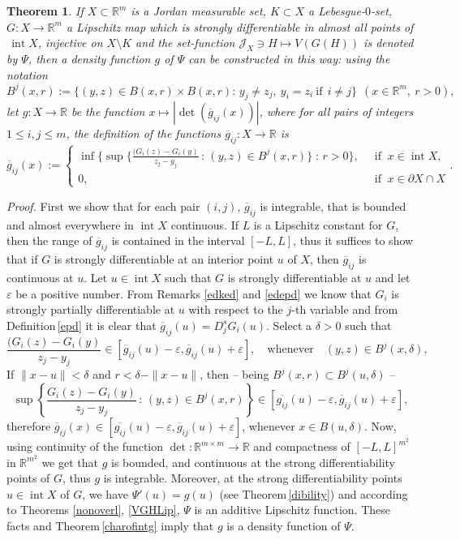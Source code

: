 \documentclass{article}
\newcommand{\proof}[1]{\textit{Proof. }#1}
\newtheorem{theorem}{Theorem}
\newcommand{\ir}{\mathop{\mathrm{int}}\nolimits}
\newcommand{\R}{\ensuremath{\mathbb R}}
\newcommand{\J}{\mathscr{J}}
\newcommand{\ee}{\varepsilon}
\newcommand{\dd}{\delta}
\newcommand{\ol}{\overline}
\begin{document}
\begin{theorem}\label{konkrsfv}
If $X\subset\R^m$ is a Jordan measurable set, $K\subset X$ a
Lebesgue-$0$-set, $G:X\to\R^m$ a Lipschitz map which is strongly
differentiable in almost all points of $\,\ir X$, injective on
$X\setminus K$ and the set-function $\J_X\ni H\mapsto V(G(H))$ is
denoted by $\Psi$, then a density function $g$ of $\Psi$ can be
constructed in this way: using the notation
\[B^j(x,r):=\{(y,z)\in B(x,r)\times B(x,r):\,y_j\neq z_j, \
y_i=z_i\ \mbox{if}\ \ i\neq j\}\ \  (x\in\R^m, \ r>0),\] let
$g\colon X\to\R$ be the function $x\mapsto|\det(\ol{g}_{ij}(x))|$,
where for all pairs of integers $1\le i,j\le m$, the definition of
the functions $\ol{g}_{ij}\colon X\to \R$ is
\[\ol{g}_{ij}(x):=\left\{
   \begin{array}{rl}
 \inf\{\sup\{\frac{(G_i(z)-G_i(y)}{z_j-y_j}\,:\,(y,z)\in B^j(x,r)\}\;:\,r>0\},&\ \mbox{ if }\ x\in\ir X,\\
0,&\ \mbox{ if }\ x\in \partial X\cap X
\end{array}\right..\]
\end{theorem}
\proof{ First we show that for each pair $(i,j)$, $\ol{g}_{ij}$ is
integrable, that is bounded and almost everywhere in $\ir X$
continuous. If $L$ is a Lipschitz constant for $G$, then the range
of $\ol{g}_{ij}$ is contained in the interval $[-L,L]$, thus it
suffices to show that if $G$ is strongly differentiable at an
interior point $u$ of $X$, then $\ol{g}_{ij}$ is continuous at
$u$. Let $u\in\ir X$ such that $G$ is strongly differentiable at
$u$ and let $\ee$ be a positive number. From Remarks \ref{edked}
and \ref{edepd} we know that $G_i$ is strongly partially
differentiable at $u$ with respect to the $j$-th variable and from
Definition\,\ref{epd} it is clear that
$\ol{g}_{ij}(u)=D^s_jG_i(u)$. Select a $\dd>0$ such that
\[\frac{(G_i(z)-G_i(y)}{z_j-y_j}\in[\ol{g}_{ij}(u)-\ee,\ol{g}_{ij}(u)+\ee],\quad\mbox{whenever}\quad
(y,z)\in B^j(x,\dd),\]
If $\|x-u\|<\dd$ and $r<\dd-\|x-u\|$, then
-- being $B^j(x,r)\subset B^j(u,\dd)$ --
\[\sup\left\{\frac{G_i(z)-G_i(y)}{z_j-y_j}\,:\,(y,z)\in B^j(x,r)\right\}\in [\ol{g_{ij}}(u)-\ee,\ol{g}_{ij}(u)+\ee],\]
therefore
$\ol{g}_{ij}(x)\in[\ol{g_{ij}}(u)-\ee,\ol{g}_{ij}(u)+\ee]$,
whenever $x\in B(u,\dd)$. Now, using continuity of the function
$\det\colon\R^{m\times m}\to\R$ and compactness of $[-L,L]^{m^2}$
in $\R^{m^2}$ we get that $g$ is bounded, and continuous at the
strong differentiability points of $G$, thus $g$ is integrable.
Moreover, at the strong differentiability points $u\in\ir X$ of
$G$, we have $\Psi'(u)=g(u)$ (see Theorem\,\ref{dibility}) and
according to Theorems \ref{nonoverl}, \ref{VGHLip}, $\Psi$ is an
additive Lipschitz function. These facts and
Theorem\,\ref{charofintg} imply that $g$ is a density function of
$\Psi$.
}%
\end{document}
